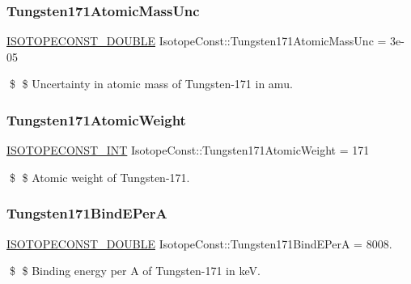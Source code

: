 \subsubsection{\texorpdfstring{Tungsten171\+Atomic\+Mass\+Unc}{Tungsten171AtomicMassUnc}}
{\footnotesize\ttfamily \mbox{\hyperlink{group___isotope_const-_macros_ga8f45a7272ce02c0b4c65c44636ed719a}{I\+S\+O\+T\+O\+P\+E\+C\+O\+N\+S\+T\+\_\+\+D\+O\+U\+B\+LE}} Isotope\+Const\+::\+Tungsten171\+Atomic\+Mass\+Unc = 3e-\/05}

\$ \$ Uncertainty in atomic mass of Tungsten-\/171 in amu. \mbox{\label{group___isotope_const-_tungsten-_w171_gaf31bdd2774c1c53a4bdec97baab9fa7f}} 
\subsubsection{\texorpdfstring{Tungsten171\+Atomic\+Weight}{Tungsten171AtomicWeight}}
{\footnotesize\ttfamily \mbox{\hyperlink{group___isotope_const-_macros_ga5f18360b3e99483a35c32d789e62621c}{I\+S\+O\+T\+O\+P\+E\+C\+O\+N\+S\+T\+\_\+\+I\+NT}} Isotope\+Const\+::\+Tungsten171\+Atomic\+Weight = 171}

\$ \$ Atomic weight of Tungsten-\/171. \mbox{\label{group___isotope_const-_tungsten-_w171_gad38c4b751229a98d94d652c752e63cdf}} 
\subsubsection{\texorpdfstring{Tungsten171\+Bind\+E\+PerA}{Tungsten171BindEPerA}}
{\footnotesize\ttfamily \mbox{\hyperlink{group___isotope_const-_macros_ga8f45a7272ce02c0b4c65c44636ed719a}{I\+S\+O\+T\+O\+P\+E\+C\+O\+N\+S\+T\+\_\+\+D\+O\+U\+B\+LE}} Isotope\+Const\+::\+Tungsten171\+Bind\+E\+PerA = 8008.}

\$ \$ Binding energy per A of Tungsten-\/171 in keV. \mbox{\label{group___isotope_const-_tungsten-_w171_ga1d3f10ca335a70f785c636e422f06215}} 
